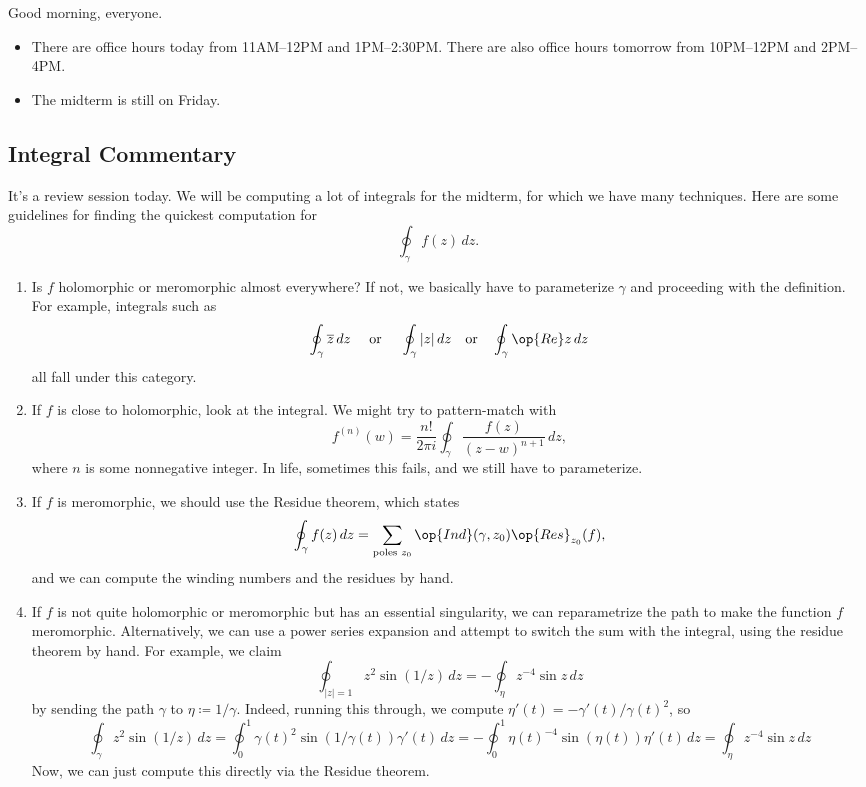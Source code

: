 
Good morning, everyone.
\begin{itemize}
	\item There are office hours today from 11AM--12PM and 1PM--2:30PM. There are also office hours tomorrow from 10PM--12PM and 2PM--4PM.
	\item The midterm is still on Friday.
\end{itemize}

\subsection{Integral Commentary}
It's a review session today. We will be computing a lot of integrals for the midterm, for which we have many techniques. Here are some guidelines for finding the quickest computation for
\[\oint_\gamma f(z)\,dz.\]
\begin{enumerate}
	\item Is $f$ holomorphic or meromorphic almost everywhere? If not, we basically have to parameterize $\gamma$ and proceeding with the definition. For example, integrals such as
	\[\oint_\gamma\overline z\,dz\quad\text{ or }\quad\oint_\gamma|z|\,dz\quad\text{or}\quad\oint_\gamma\op{Re}z\,dz\]
	all fall under this category.

	\item If $f$ is close to holomorphic, look at the integral. We might try to pattern-match with
	\[f^{(n)}(w)=\frac{n!}{2\pi i}\oint_\gamma\frac{f(z)}{(z-w)^{n+1}}\,dz,\]
	where $n$ is some nonnegative integer. In life, sometimes this fails, and we still have to parameterize.
	\item If $f$ is meromorphic, we should use the Residue theorem, which states
	\[\oint_\gamma f(z)\,dz=\sum_{\text{poles }z_0}\op{Ind}(\gamma,z_0)\op{Res}_{z_0}(f),\]
	and we can compute the winding numbers and the residues by hand.
	\item If $f$ is not quite holomorphic or meromorphic but has an essential singularity, we can reparametrize the path to make the function $f$ meromorphic. Alternatively, we can use a power series expansion and attempt to switch the sum with the integral, using the residue theorem by hand. For example, we claim
	\[\oint_{|z|=1}z^2\sin(1/z)\,dz=-\oint_\eta z^{-4}\sin z\,dz\]
	by sending the path $\gamma$ to $\eta\coloneqq 1/\gamma$. Indeed, running this through, we compute $\eta'(t)=-\gamma'(t)/\gamma(t)^2$, so
	\[\oint_{\gamma}z^2\sin(1/z)\,dz=\oint_0^1\gamma(t)^2\sin(1/\gamma(t))\gamma'(t)\,dz=-\oint_0^1\eta(t)^{-4}\sin(\eta(t))\eta'(t)\,dz=\oint_\eta z^{-4}\sin z\,dz\]
	Now, we can just compute this directly via the Residue theorem.
\end{enumerate}


